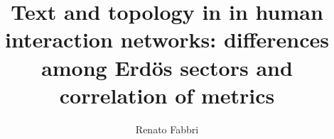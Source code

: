 \documentclass[%
 aip,
 jmp,%
 amsmath,amssymb,
 reprint,%
]{revtex4-1}
\begin{document}

\title[Text and topology in interaction networks]{Text and topology in in human interaction networks: differences among Erd\"os sectors and correlation of metrics}%

\author{Renato Fabbri}%
%
%
%

%
%
%
%
%
\end{document}
